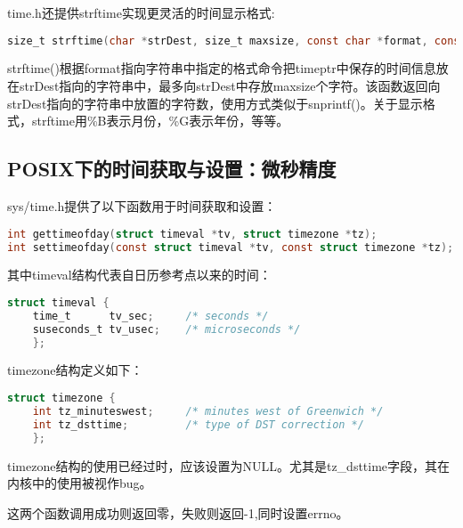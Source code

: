 time.h还提供strftime实现更灵活的时间显示格式:
\begin{lstlisting}[language=C]
size_t strftime(char *strDest, size_t maxsize, const char *format, const struct tm *timeptr); 
\end{lstlisting}

strftime()根据format指向字符串中指定的格式命令把timeptr中保存的时间信息放在strDest指向的字符串中，最多向strDest中存放maxsize个字符。该函数返回向strDest指向的字符串中放置的字符数，使用方式类似于snprintf()。关于显示格式，strftime用\%B表示月份，\%G表示年份，等等。

\subsection{POSIX下的时间获取与设置：微秒精度}
sys/time.h提供了以下函数用于时间获取和设置：
\begin{lstlisting}[language=C]
int gettimeofday(struct timeval *tv, struct timezone *tz);
int settimeofday(const struct timeval *tv, const struct timezone *tz);
\end{lstlisting}

其中timeval结构代表自日历参考点以来的时间：

\begin{lstlisting}[language=C]
    struct timeval {
    time_t      tv_sec;     /* seconds */
    suseconds_t tv_usec;    /* microseconds */
    };
\end{lstlisting}

timezone结构定义如下：
\begin{lstlisting}[language=C]
    struct timezone {
    int tz_minuteswest;     /* minutes west of Greenwich */
    int tz_dsttime;         /* type of DST correction */
    };
\end{lstlisting}

timezone结构的使用已经过时，应该设置为NULL。尤其是tz\_dsttime字段，其在内核中的使用被视作bug。

这两个函数调用成功则返回零，失败则返回-1,同时设置errno。


















